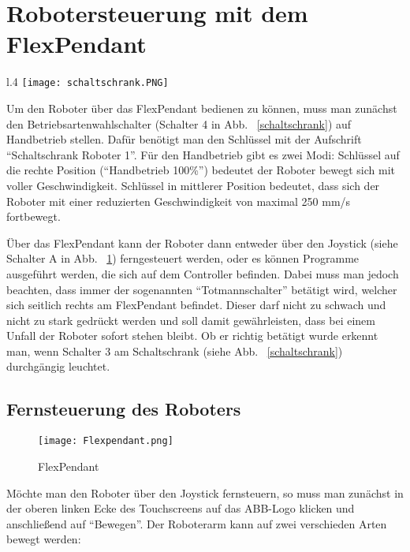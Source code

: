 \section{Robotersteuerung mit dem FlexPendant}
\label{flexsection}
\begin{wrapfigure}{l}{.4\textwidth}
\centering
\texttt{[image: schaltschrank.PNG]}
\vspace{-15pt}
\caption{Schaltschrank} 
\label{schaltschrank}
\end{wrapfigure}

Um den Roboter über das FlexPendant bedienen zu können, muss man zunächst den Betriebsartenwahlschalter (Schalter 4 in Abb. ~\ref{schaltschrank}) auf Handbetrieb stellen. Dafür benötigt man den Schlüssel mit der Aufschrift \enquote{Schaltschrank Roboter 1}. Für den Handbetrieb gibt es zwei Modi: Schlüssel auf die rechte Position (\enquote{Handbetrieb 100\%}) bedeutet der Roboter bewegt sich mit voller Geschwindigkeit. Schlüssel in mittlerer Position bedeutet, dass sich der Roboter mit einer reduzierten Geschwindigkeit von maximal 250 mm/s fortbewegt.

Über das FlexPendant kann der Roboter dann entweder über den Joystick (siehe Schalter A in Abb. ~\ref{flexpendant}) ferngesteuert werden, oder es können Programme ausgeführt werden, die sich auf dem Controller befinden. Dabei muss man jedoch beachten, dass immer der sogenannten \enquote{Totmannschalter} betätigt wird, welcher sich seitlich rechts am FlexPendant befindet. Dieser darf nicht zu schwach und nicht zu stark gedrückt werden und soll damit gewährleisten, dass bei einem Unfall der Roboter sofort stehen bleibt. Ob er richtig betätigt wurde erkennt man, wenn Schalter 3 am Schaltschrank (siehe Abb. ~\ref{schaltschrank}) durchgängig leuchtet. 

\subsection{Fernsteuerung des Roboters}

\begin{figure}[htbp]
\centering
\texttt{[image: Flexpendant.png]}
\caption{FlexPendant} 
\label{flexpendant}
\end{figure}

Möchte man den Roboter über den Joystick fernsteuern, so muss man zunächst in der oberen linken Ecke des Touchscreens auf das ABB-Logo klicken und anschließend auf \enquote{Bewegen}. Der Roboterarm kann auf zwei verschieden Arten bewegt werden:

